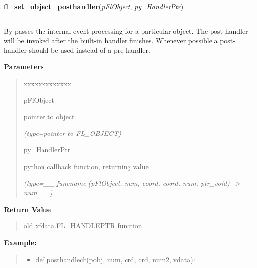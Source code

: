 \hspace{.8\funcindent}\begin{boxedminipage}{\funcwidth}

    \raggedright \textbf{fl\_set\_object\_posthandler}(\textit{pFlObject}, \textit{py\_HandlerPtr})

    \vspace{-1.5ex}

    \rule{\textwidth}{0.5\fboxrule}
\setlength{\parskip}{2ex}
    By-passes the internal event processing for a particular object. The 
    post-handler will be invoked after the built-in handler finishes. 
    Whenever possible a post-handler should be used instead of a 
    pre-handler.

\setlength{\parskip}{1ex}
      \textbf{Parameters}
      \vspace{-1ex}

      \begin{quote}
        \begin{Ventry}{xxxxxxxxxxxxx}

          \item[pFlObject]

          pointer to object

            {\it (type=pointer to FL\_OBJECT)}

          \item[py\_HandlerPtr]

          python callback function, returning value

            {\it (type=\_\_ funcname (pFlObject, num, coord, coord, num, ptr\_void) 
-{\textgreater} num \_\_)}

        \end{Ventry}

      \end{quote}

      \textbf{Return Value}
    \vspace{-1ex}

      \begin{quote}
      old xfdata.FL\_HANDLEPTR function

      \end{quote}

\textbf{Example:}
\begin{quote}
  \begin{itemize}

  \item
    \setlength{\parskip}{0.6ex}
def posthandlecb(pobj, num, crd, crd, num2, vdata):




\end{itemize}
\end{quote}
\end{boxedminipage}
